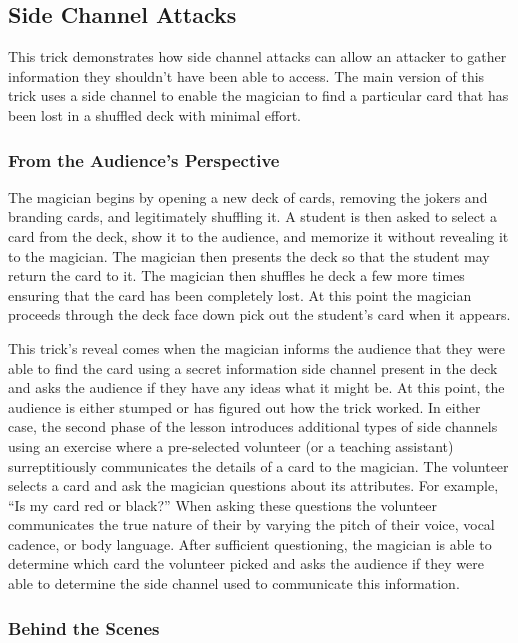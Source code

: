 \subsection{Side Channel Attacks}

This trick demonstrates how side channel attacks can allow an attacker to
gather information they shouldn't have been able to access.
The main version of this trick uses a side channel to enable the magician to
find a particular card that has been lost in a shuffled deck with minimal
effort.

\subsubsection{From the Audience's Perspective}

The magician begins by opening a new deck of cards, removing the jokers and
branding cards, and legitimately shuffling it.  A student is then asked to
select a card from the deck, show it to the audience, and memorize it without
revealing it to the magician.
The magician then presents the deck so that the student may return
the card to it.
The magician then shuffles he deck a few more times ensuring that the card has
been completely lost.
At this point the magician proceeds through the deck face down pick out the
student's card when it appears.

This trick's reveal comes when the magician informs the audience that they were
able to find the card using a secret information side channel present in the
deck and asks the audience if they have any ideas what it might be.
At this point, the audience is either stumped or has figured out how the trick
worked.  In either case,  the second phase of the lesson
introduces additional types of side channels
using an
exercise where a pre-selected volunteer (or a teaching assistant)
surreptitiously
communicates the details of a card
to the magician.
The volunteer selects a card and ask the magician questions about its
attributes.
For example, ``Is my card red or black?''
When asking these questions the volunteer communicates the true nature of their
by varying the pitch of their voice, vocal cadence, or body language.
After sufficient questioning, the magician is able to determine which card the
volunteer picked and asks the audience if they were able to determine the side
channel used to communicate this information.

\subsubsection{Behind the Scenes}

